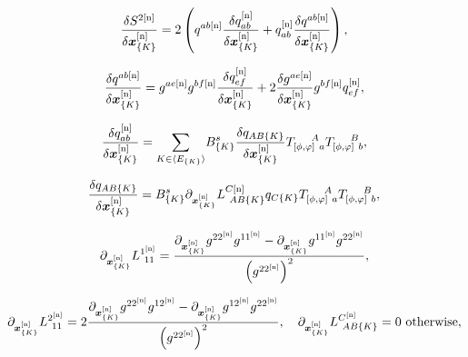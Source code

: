 \begin{equation} \label{B.26}
	\frac{ \delta S^{2[\textup{n}]}}{\delta  \bm{x}_{\{K\}}^{[\textup{n}]}}  =  2\left(q^{ab[\textup{n}]}\frac{\delta q_{ab}^{[\textup{n}]}}{\delta  \bm{x}_{\{K\}}^{[\textup{n}]}} + q_{ab}^{[\textup{n}]}\frac{\delta q^{ab[\textup{n}]}}{\delta  \bm{x}_{\{K\}}^{[\textup{n}]}}  \right),
\end{equation}

\begin{equation} \label{B.27}
	\frac{\delta q^{ab[\textup{n}]}}{\delta  \bm{x}_{\{K\}}^{[\textup{n}]}} = g^{ae[\textup{n}]}g^{bf[\textup{n}]}  \frac{\delta q_{ef}^{[\textup{n}]}}{\delta  \bm{x}_{\{K\}}^{[\textup{n}]}} + 2   \frac{\delta g^{ae[\textup{n}]}}{\delta  \bm{x}_{\{K\}}^{[\textup{n}]}} g^{bf[\textup{n}]} q_{ef}^{[\textup{n}]},
\end{equation}

\begin{equation} \label{B.28}
	\frac{\delta q_{ab}^{[\textup{n}]}}{\delta  \bm{x}_{\{K\}}^{[\textup{n}]}} =\underset{K \in \langle E_{\{K\}} \rangle }{\mathrm{\sum}} B_{\{K\}}^s\frac{\delta q_{AB\{K\}}}{\delta \bm{x}_{\{K\}}^{[\textup{n}]}} T_{[\phi,\varphi]~a}^{\quad \,\, A}  T_{[\phi,\varphi]~b}^{\quad \,\, B} ,
\end{equation}


\begin{equation} \label{B.29}
	\frac{\delta q_{AB\{K\}}}{\delta \bm{x}_{\{K\}}^{[\textup{n}]}} =  B_{\{K\}}^s \partial_{\bm{x}_{\{K\}}^{[\textup{n}]}}L_{~AB\{K\}}^{C[\textup{n}]}q_{C\{K\}} T_{[\phi,\varphi]~a}^{\quad \,\, A}  T_{[\phi,\varphi]~b}^{\quad \,\, B} ,
\end{equation}

\begin{equation} \label{B.30}
	\partial_{\bm{x}_{\{K\}}^{[\textup{n}]}}  L_{~11}^{1^{[\textup{n}]}} =  \frac{\partial_{\bm{x}_{\{K\}}^{[\textup{n}]}}  g^{22^{[\textup{n}]}} g^{11^{[\textup{n}]}} - \partial_{\bm{x}_{\{K\}}^{[\textup{n}]}}g^{11^{[\textup{n}]}}g^{22^{[\textup{n}]}}}{\left(g^{22^{[\textup{n}]}}\right)^2},
\end{equation}

\begin{equation} \label{B.31}
	\partial_{\bm{x}_{\{K\}}^{[\textup{n}]}}  L_{~11}^{2^{[\textup{n}]}} = 2 \frac{\partial_{\bm{x}_{\{K\}}^{[\textup{n}]}} g^{22^{[\textup{n}]}}g^{12^{[\textup{n}]}} - \partial_{\bm{x}_{\{K\}}^{[\textup{n}]}} g^{12^{[\textup{n}]}}g^{22^{[\textup{n}]}}}{\left(g^{22^{[\textup{n}]}}\right)^2}, \quad \partial_{\bm{x}_{\{K\}}^{[\textup{n}]}}  L_{~AB\{K\}}^{C^{[\textup{n}]}} = 0 \text{ otherwise},
\end{equation}

